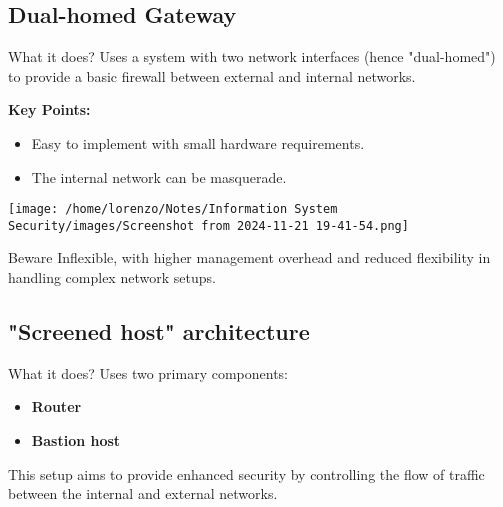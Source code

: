 \subsection{Dual-homed Gateway}
\vspace{0.2cm}
\begin{quotebox-yellow}{What it does?}
Uses a system with two network interfaces (hence "dual-homed") to provide a basic firewall between external and internal networks.
\end{quotebox-yellow}

\begin{minipage}{0.5\textwidth}
	\vspace{-2cm}
    \textbf{Key Points:}
    \begin{itemize}
        \item Easy to implement with small hardware requirements.
        \item The internal network can be masquerade.
    \end{itemize}
\end{minipage} 
\hfill
\begin{minipage}{0.5\textwidth}
    \centering
    \texttt{[image: /home/lorenzo/Notes/Information System Security/images/Screenshot from 2024-11-21 19-41-54.png]}
\end{minipage}
\begin{center}
    \begin{quotebox-red}{Beware}
        Inflexible, with higher management overhead and reduced flexibility in handling complex network setups.
    \end{quotebox-red}   
\end{center}

\subsection{"Screened host" architecture}
\begin{quotebox-yellow}{What it does?}
    Uses two primary components: 
    \begin{itemize}
        \item \textbf{Router}
        \item \textbf{Bastion host}
    \end{itemize}
    This setup aims to provide enhanced security by controlling the flow of traffic between the internal and external networks.
\end{quotebox-yellow}

